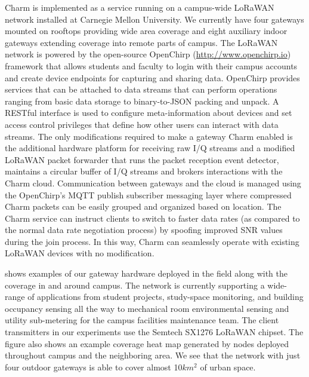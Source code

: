 Charm is implemented as a service running on a campus-wide LoRaWAN network installed at Carnegie Mellon University.  We currently have four gateways mounted on rooftops providing wide area coverage and eight auxiliary indoor gateways extending coverage into remote parts of campus. The LoRaWAN network is powered by the open-source OpenChirp (\url{http://www.openchirp.io}) framework that allows students and faculty to login with their campus accounts and create device endpoints for capturing and sharing data.  OpenChirp provides services that can be attached to data streams that can perform operations ranging from basic data storage to binary-to-JSON packing and unpack. A RESTful interface is used to configure meta-information about devices and set access control privileges that define how other users can interact with data streams.  The only modifications required to make a gateway Charm enabled is the additional hardware platform for receiving raw I/Q streams and a modified LoRaWAN packet forwarder that runs the packet reception event detector, maintains a circular buffer of I/Q streams and brokers interactions with the Charm cloud.  Communication between gateways and the cloud is managed using the OpenChirp's MQTT publish subscriber messaging layer where compressed Charm packets can be easily grouped and organized based on location.  The Charm service can instruct clients to switch to faster data rates (as compared to the normal data rate negotiation process) by spoofing improved SNR values during the join process. In this way, Charm can seamlessly operate with existing LoRaWAN devices with no modification.

 shows examples of our gateway hardware deployed in the field along with the coverage in and around campus.  The network is currently supporting a wide-range of applications from student projects, study-space monitoring, and building occupancy sensing all the way to mechanical room environmental sensing and utility sub-metering for the campus facilities maintenance team.  The client transmitters in our experiments use the Semtech SX1276 LoRaWAN chipset. The figure also shows an example coverage heat map generated by nodes deployed throughout campus and the neighboring area.  We see that the network with just four outdoor gateways is able to cover almost 10$km^2$ of urban space.

